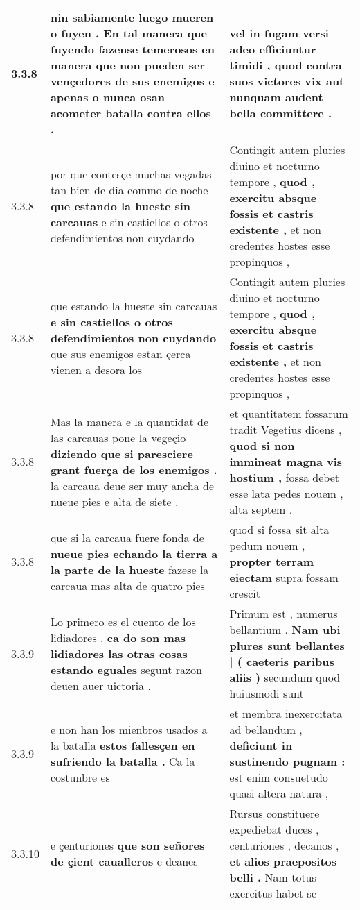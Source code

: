\begin{tabular}{|p{1cm}|p{6.5cm}|p{6.5cm}|}
3.3.8 & nin sabiamente luego mueren o fuyen . \textbf{ En tal manera que fuyendo fazense temerosos en manera que non pueden ser vençedores de sus enemigos } e apenas o nunca osan acometer batalla contra ellos . & vel in fugam versi \textbf{ adeo efficiuntur timidi , } quod contra suos victores vix aut nunquam audent bella committere . \\\hline
3.3.8 & por que contesçe muchas vegadas tan bien de dia commo de noche \textbf{ que estando la hueste sin carcauas } e sin castiellos o otros defendimientos non cuydando & Contingit autem pluries diuino et nocturno tempore , \textbf{ quod , exercitu absque fossis et castris existente , } et non credentes hostes esse propinquos , \\\hline
3.3.8 & que estando la hueste sin carcauas \textbf{ e sin castiellos o otros defendimientos non cuydando } que sus enemigos estan çerca vienen a desora los & Contingit autem pluries diuino et nocturno tempore , \textbf{ quod , exercitu absque fossis et castris existente , } et non credentes hostes esse propinquos , \\\hline
3.3.8 & Mas la manera e la quantidat de las carcauas pone la vegeçio \textbf{ diziendo que si paresciere grant fuerça de los enemigos . } la carcaua deue ser muy ancha de nueue pies e alta de siete . & et quantitatem fossarum tradit Vegetius dicens , \textbf{ quod si non immineat magna vis hostium , } fossa debet esse lata pedes nouem , alta septem . \\\hline
3.3.8 & que si la carcaua fuere fonda de \textbf{ nueue pies echando la tierra a la parte de la hueste } fazese la carcaua mas alta de quatro pies & quod si fossa sit alta pedum nouem , \textbf{ propter terram eiectam } supra fossam crescit \\\hline
3.3.9 & Lo primero es el cuento de los lidiadores . \textbf{ ca do son mas lidiadores las otras cosas estando eguales } segunt razon deuen auer uictoria . & Primum est , numerus bellantium . \textbf{ Nam ubi plures sunt bellantes | ( caeteris paribus aliis ) } secundum quod huiusmodi sunt \\\hline
3.3.9 & e non han los mienbros usados a la batalla \textbf{ estos fallesçen en sufriendo la batalla . } Ca la costunbre es & et membra inexercitata ad bellandum , \textbf{ deficiunt in sustinendo pugnam : } est enim consuetudo quasi altera natura , \\\hline
3.3.10 & e çenturiones \textbf{ que son señores de çient caualleros } e deanes & Rursus constituere expediebat duces , centuriones , decanos , \textbf{ et alios praepositos belli . } Nam totus exercitus habet se \\\hline

\end{tabular}
